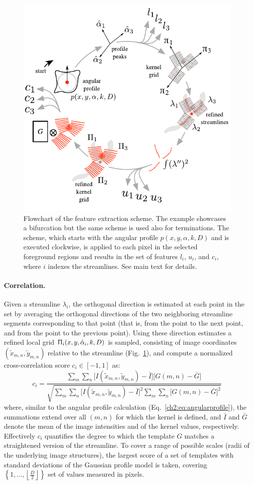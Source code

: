 \begin{figure}[!t]
	\centering
	\includegraphics[width=0.5\columnwidth]{fig4}
	\caption{Flowchart of the feature extraction scheme. The example showcases a bifurcation but the same scheme is used also for terminations. The scheme, which starts with the angular profile $p(x,y,\alpha,k,D)$ and is executed clockwise, is applied to each pixel in the selected foreground regions and results in the set of features $l_i$, $u_i$, and $c_i$, where $i$ indexes the streamlines. See main text for details.}
	\label{ch2_fig4}
\end{figure}

\paragraph{Correlation.} Given a streamline $\lambda_{i}$, the orthogonal direction is estimated at each point in the set by averaging the orthogonal directions of the two neighboring streamline segments corresponding to that point (that is, from the point to the next point, and from the point to the previous point). Using these direction estimates a refined local grid $\Uppi_{i}(x,y,\hat{\alpha}_{i},k,D)$ is sampled, consisting of image coordinates $(\tilde{x}_{m,n},\tilde{y}_{m,n})$ relative to the streamline (Fig.~\ref{ch2_fig4}), and compute a normalized cross-correlation \cite{lewis1995fast, yoo2009fast} score $c_{i}\in[-1,1]$ as:
\begin{equation} 
\label{eq:correlation}
c_{i} = \frac{\sum_{m}\sum_{n} \bigl[I(\tilde{x}_{m,n},\tilde{y}_{m,n})-\bar{I}\bigr] \bigl[G(m,n)-\bar{G}\bigr]}{\sqrt{\sum_{m}\sum_{n}\bigl[I(\tilde{x}_{m,n},\tilde{y}_{m,n})-\bar{I}\bigr]^{2}\sum_{m}\sum_{n}\bigl[G(m,n)-\bar{G}\bigr]^{2}}}
\end{equation}
where, similar to the angular profile calculation (Eq.~\ref{ch2:eq:angularprofile}), the summations extend over all $(m,n)$ for which the kernel is defined, and $\bar{I}$ and $\bar{G}$ denote the mean of the image intensities and of the kernel values, respectively. Effectively $c_{i}$ quantifies the degree to which the template $G$ matches a straightened version of the streamline. To cover a range of possible scales (radii of the underlying image structures), the largest score of a set of templates with standard deviations of the Gaussian profile model \cite{su2012junction} is taken, covering $\left\lbrace 1,\dots,\left\lfloor{\frac{D}{2}}\right\rfloor\right\rbrace $ set of values measured in pixels.


